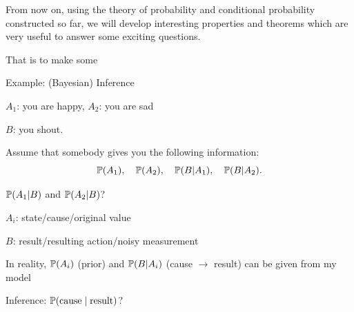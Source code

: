 \documentclass[handout,fleqn,aspectratio=169]{beamer}
\begin{document}
\begin{frame}{}
\vspace{2cm}
\LARGE From now on, using the theory of probability and conditional probability constructed so far, we will develop interesting properties and theorems which are very useful to answer some exciting questions. 

\medskip

\LARGE That is  to make some 

\end{frame}

\begin{frame}{Example: (Bayesian) Inference}

{
\plitemsep 0.1in
\bci 

\item<2-> $A_1$: you are happy, $A_2$: you are sad
\item<2-> $B$: you shout. 

\item<4-> Assume that somebody gives you the following information:
$$
\mathbb{P}( A_1 ), \quad \mathbb{P}( A_2 ), \quad \mathbb{P}( B | A_1 ), \quad\mathbb{P}( B | A_2 ).
$$

\item<6->  $\mathbb{P}( A_1 | B )$ and $\mathbb{P}( A_2 | B )$?
\eci 
}
{
\plitemsep 0.1in
\bci 

\item<3-> $A_i$: state/cause/original value
\item<3-> $B$: result/resulting action/noisy measurement

\item<5-> In reality, $\mathbb{P}( A_i )$ (prior) and $\mathbb{P}( B | A_i )$ (cause $\rightarrow$ result) can be given from my model

\item<7-> Inference: $\mathbb{P}( \text{cause} \mid \text{result} )$?

\eci 
}

\medskip


\end{frame}
\end{document}
